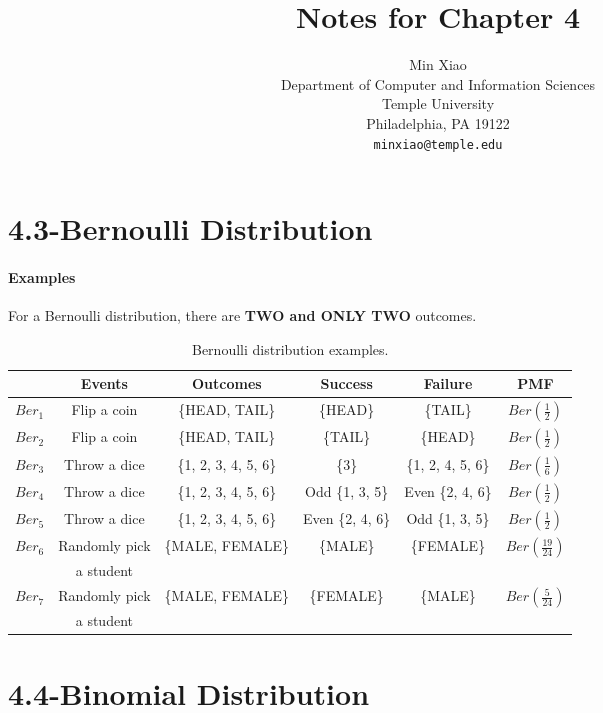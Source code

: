\documentclass{article} %
\title{Notes for Chapter 4}
\author{
Min Xiao\\
Department of Computer and Information Sciences\\
Temple University\\
Philadelphia, PA 19122 \\
\texttt{minxiao@temple.edu} \\
}
\begin{document}
\maketitle

\section*{4.3-Bernoulli Distribution}
\paragraph*{Examples} For a Bernoulli distribution, there are {\bf TWO and ONLY TWO} outcomes. 
\begin{table}[h!]
\begin{center}
\renewcommand{\arraystretch}{1.5}
\begin{tabular}{|c|c|c|c|c|c|} \hline
& Events & Outcomes & Success & Failure & PMF \\ \hline 
$Ber_1$ & Flip a coin & \{HEAD, TAIL\} & \{HEAD\} & \{TAIL\} & $Ber(\frac{1}{2})$ \\ \hline
$Ber_2$ & Flip a coin & \{HEAD, TAIL\} & \{TAIL\} & \{HEAD\} & $Ber(\frac{1}{2})$ \\ \hline
$Ber_3$ & Throw a dice & \{1, 2, 3, 4, 5, 6\} & \{3\} & \{1, 2, 4, 5, 6\} & $Ber(\frac{1}{6})$ \\ \hline
$Ber_4$ & Throw a dice & \{1, 2, 3, 4, 5, 6\} & Odd \{1, 3, 5\} & Even \{2, 4, 6\} & $Ber(\frac{1}{2})$ \\ \hline
$Ber_5$ & Throw a dice & \{1, 2, 3, 4, 5, 6\} & Even \{2, 4, 6\} & Odd \{1, 3, 5\} & $Ber(\frac{1}{2})$ \\ \hline
\multirow{2}{*}{$Ber_6$} & Randomly pick & \multirow{2}{*}{\{MALE, FEMALE\}} & \multirow{2}{*}{\{MALE\}} & \multirow{2}{*}{\{FEMALE\}} & \multirow{2}{*}{$Ber(\frac{19}{24})$} \\
& a student & & & & \\ \hline
\multirow{2}{*}{$Ber_7$} & Randomly pick & \multirow{2}{*}{\{MALE, FEMALE\}} & \multirow{2}{*}{\{FEMALE\}} & \multirow{2}{*}{\{MALE\}} & \multirow{2}{*}{$Ber(\frac{5}{24})$} \\
& a student& & & & \\
\hline
\end{tabular}
\caption{Bernoulli distribution examples.}
\label{Ta:ber}
\end{center}
\end{table}

\newpage 

\section*{4.4-Binomial Distribution}
\end{document}
